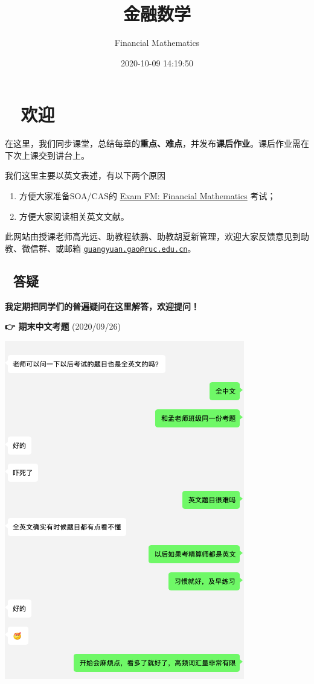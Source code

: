 \documentclass[
]{book}
\title{金融数学}
\author{Financial Mathematics}
\date{2020-10-09 14:19:50}
\begin{document}
\maketitle

{
\setcounter{tocdepth}{1}
\tableofcontents
}
\hypertarget{ux6b22ux8fce}{%
\chapter*{👨‍🏫 欢迎}\label{ux6b22ux8fce}}

在这里，我们同步课堂，总结每章的\textbf{重点、难点}，并发布\textbf{课后作业}。课后作业需在下次上课交到讲台上。

我们这里主要以英文表述，有以下两个原因

\begin{enumerate}
\def\labelenumi{\arabic{enumi}.}
\item
  方便大家准备SOA/CAS的 \href{https://www.soa.org/education/exam-req/edu-exam-fm-detail/}{Exam FM: Financial Mathematics} 考试；
\item
  方便大家阅读相关英文文献。
\end{enumerate}

此网站由授课老师高光远、助教程轶鹏、助教胡夏新管理，欢迎大家反馈意见到助教、微信群、或邮箱 \href{mailto:guangyuan.gao@ruc.edu.cn}{\nolinkurl{guangyuan.gao@ruc.edu.cn}}。

\hypertarget{ux7b54ux7591}{%
\section*{🤔 答疑}\label{ux7b54ux7591}}

\textbf{我定期把同学们的普遍疑问在这里解答，欢迎提问！}

\textbf{👉 期末中文考题} (2020/09/26)

\begin{center}\includegraphics[width=0.3\linewidth]{./plots/english} \end{center}
\end{document}
